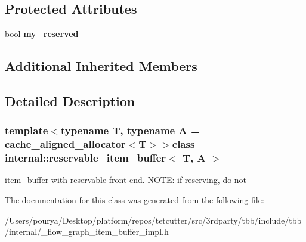 \subsection*{Protected Attributes}
\begin{DoxyCompactItemize}
\item 
\hypertarget{classinternal_1_1reservable__item__buffer_acf400c46c43cf0d15edd67c3d1f0b3ed}{}bool {\bfseries my\+\_\+reserved}\label{classinternal_1_1reservable__item__buffer_acf400c46c43cf0d15edd67c3d1f0b3ed}

\end{DoxyCompactItemize}
\subsection*{Additional Inherited Members}


\subsection{Detailed Description}
\subsubsection*{template$<$typename T, typename A = cache\+\_\+aligned\+\_\+allocator$<$\+T$>$$>$class internal\+::reservable\+\_\+item\+\_\+buffer$<$ T, A $>$}

\hyperlink{classinternal_1_1item__buffer}{item\+\_\+buffer} with reservable front-\/end. N\+O\+T\+E\+: if reserving, do not 

The documentation for this class was generated from the following file\+:\begin{DoxyCompactItemize}
\item 
/\+Users/pourya/\+Desktop/platform/repos/tetcutter/src/3rdparty/tbb/include/tbb/internal/\+\_\+flow\+\_\+graph\+\_\+item\+\_\+buffer\+\_\+impl.\+h\end{DoxyCompactItemize}
